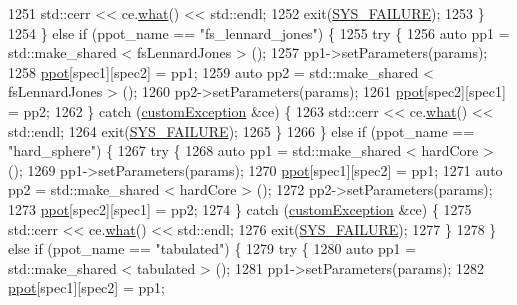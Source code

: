 \begin{DoxyCode}
1251             std::cerr << ce.\hyperlink{classcustom_exception_aeb6ab5848b038adfc68fde86a512f691}{what}() << std::endl;
1252             exit(\hyperlink{global_8h_a428dfe1ef0a6ff4b1fdebf275f6aff2e}{SYS\_FAILURE});
1253         \}
1254     \} \textcolor{keywordflow}{else} \textcolor{keywordflow}{if} (ppot\_name == \textcolor{stringliteral}{"fs\_lennard\_jones"}) \{
1255         \textcolor{keywordflow}{try} \{
1256             \textcolor{keyword}{auto} pp1 = std::make\_shared < fsLennardJones > ();
1257             pp1->setParameters(params);
1258             \hyperlink{classsim_system_ad2e290b5963f132e6a3a56cee35c8e9f}{ppot}[spec1][spec2] = pp1;
1259             \textcolor{keyword}{auto} pp2 = std::make\_shared < fsLennardJones > ();
1260             pp2->setParameters(params);
1261             \hyperlink{classsim_system_ad2e290b5963f132e6a3a56cee35c8e9f}{ppot}[spec2][spec1] = pp2;
1262         \} \textcolor{keywordflow}{catch} (\hyperlink{classcustom_exception}{customException} &ce) \{
1263             std::cerr << ce.\hyperlink{classcustom_exception_aeb6ab5848b038adfc68fde86a512f691}{what}() << std::endl;
1264             exit(\hyperlink{global_8h_a428dfe1ef0a6ff4b1fdebf275f6aff2e}{SYS\_FAILURE});
1265         \}
1266     \} \textcolor{keywordflow}{else} \textcolor{keywordflow}{if} (ppot\_name == \textcolor{stringliteral}{"hard\_sphere"}) \{
1267         \textcolor{keywordflow}{try} \{
1268             \textcolor{keyword}{auto} pp1 = std::make\_shared < hardCore > ();
1269             pp1->setParameters(params);
1270             \hyperlink{classsim_system_ad2e290b5963f132e6a3a56cee35c8e9f}{ppot}[spec1][spec2] = pp1;
1271             \textcolor{keyword}{auto} pp2 = std::make\_shared < hardCore > ();
1272             pp2->setParameters(params);
1273             \hyperlink{classsim_system_ad2e290b5963f132e6a3a56cee35c8e9f}{ppot}[spec2][spec1] = pp2;
1274         \} \textcolor{keywordflow}{catch} (\hyperlink{classcustom_exception}{customException} &ce) \{
1275             std::cerr << ce.\hyperlink{classcustom_exception_aeb6ab5848b038adfc68fde86a512f691}{what}() << std::endl;
1276             exit(\hyperlink{global_8h_a428dfe1ef0a6ff4b1fdebf275f6aff2e}{SYS\_FAILURE});
1277         \}
1278     \} \textcolor{keywordflow}{else} \textcolor{keywordflow}{if} (ppot\_name == \textcolor{stringliteral}{"tabulated"}) \{
1279         \textcolor{keywordflow}{try} \{
1280             \textcolor{keyword}{auto} pp1 = std::make\_shared < tabulated > ();
1281             pp1->setParameters(params);
1282             \hyperlink{classsim_system_ad2e290b5963f132e6a3a56cee35c8e9f}{ppot}[spec1][spec2] = pp1;

\end{DoxyCode}
